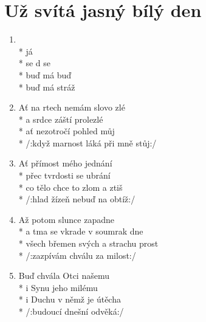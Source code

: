 \section{Už svítá jasný bílý den}
\begin{enumerate}
\item {}     \\*
já    \\*
se d  se   \\*
buď  má  buď    \\*
buď  má stráž   
\item Ať na     rtech nemám slovo zlé \\*
a srdce záští prolezlé \\*
ať nezotročí pohled můj \\*
/:když marnost láká při mně stůj:/ 
\item Ať přímost mého jednání \\*
přec tvrdosti se ubrání \\*
co tělo chce to zlom a ztiš \\*
/:hlad žízeň nebuď na obtíž:/ 
\item Až potom slunce zapadne \\*
a tma se vkrade v soumrak dne \\*
všech břemen svých a strachu prost \\*
/:zazpívám chválu za milost:/ 
\item Buď chvála Otci našemu \\*
i Synu jeho milému \\*
i Duchu v němž je útěcha \\*
/:budoucí dnešní odvěká:/
\end{enumerate}
